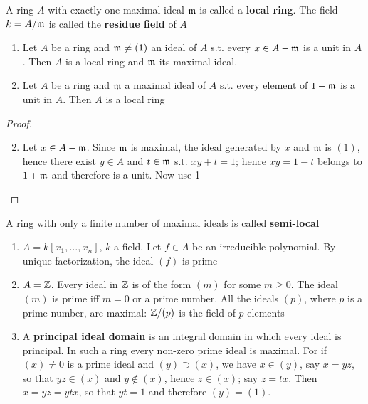 \documentclass[11pt]{article}
\begin{document}
A ring \(A\) with exactly one maximal ideal \(\mathfrak{m}\) is called a \textbf{local ring}. The field \(k=A/\mathfrak{m}\) is
called the \textbf{residue field} of \(A\)

\begin{proposition}[]
\begin{enumerate}
\item Let \(A\) be a ring and \(\mathfrak{m}\neq(1)\) an ideal of \(A\) s.t. every \(x\in A-\mathfrak{m}\) is a unit in \(A\).
Then \(A\) is a local ring and \(\mathfrak{m}\) its maximal ideal.
\item Let \(A\) be a ring and \(\mathfrak{m}\) a maximal ideal of \(A\) s.t. every element of \(1+\mathfrak{m}\) is a
unit in \(A\). Then \(A\) is a local ring
\end{enumerate}
\end{proposition}

\begin{proof}
\begin{enumerate}
\setcounter{enumi}{1}
\item Let \(x\in A-\mathfrak{m}\). Since \(\mathfrak{m}\) is maximal, the ideal generated by \(x\) and \(\mathfrak{m}\)
is \((1)\), hence there exist \(y\in A\) and \(t\in\mathfrak{m}\) s.t. \(xy+t=1\); hence \(xy=1-t\) belongs
to \(1+\mathfrak{m}\) and therefore is a unit. Now use 1
\end{enumerate}
\end{proof}

A ring with only a finite number of maximal ideals is called \textbf{semi-local}

\begin{examplle}[]
\begin{enumerate}
\item \(A=k[x_1,\dots,x_n]\), \(k\) a field. Let \(f\in A\) be an irreducible polynomial. By unique
factorization, the ideal \((f)\) is prime
\item \(A=\mathbb{Z}\). Every ideal in \(\mathbb{Z}\) is of the form \((m)\) for some \(m\ge 0\). The ideal \((m)\) is
prime iff \(m=0\) or a prime number. All the ideals \((p)\), where \(p\) is a prime number,
are maximal: \(\mathbb{Z}/(p)\) is the field of \(p\) elements
\item A \textbf{principal ideal domain} is an integral domain in which every ideal is principal. In such a
ring every non-zero prime ideal is maximal. For if \((x)\neq 0\) is a prime ideal
and \((y)\supset(x)\), we have \(x\in(y)\), say \(x=yz\), so that \(yz\in(x)\) and \(y\notin(x)\),
hence \(z\in(x)\); say \(z=tx\). Then \(x=yz=ytx\), so that \(yt=1\) and therefore \((y)=(1)\).
\end{enumerate}
\end{examplle}
\end{document}
